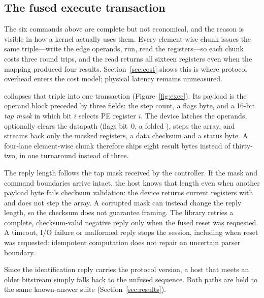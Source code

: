 \subsection{The fused execute transaction}
\label{sec:exec}

The six commands above are complete but not economical, and the reason is
visible in how a kernel actually uses them. Every element-wise chunk issues the
same triple---write the edge operands, run, read the registers---so each chunk
costs three round trips, and the read returns all sixteen registers even when
the mapping produced four results. Section~\ref{sec:cost} shows this is where
protocol overhead enters the cost model; physical latency remains unmeasured.

 collapses that triple into one transaction
(Figure~\ref{fig:exec}). Its payload is the  operand block preceded by
three fields: the step count, a flags byte, and a 16-bit \emph{tap mask} in
which bit $i$ selects PE register $i$. The device latches the operands,
optionally clears the datapath (flags bit~0, a folded ), steps the
array, and streams back only the masked registers, a data checksum and a status
byte. A four-lane element-wise chunk therefore ships eight result bytes instead
of thirty-two, in one turnaround instead of three.



The reply length follows the tap mask received by the controller. If the mask
and command boundaries arrive intact, the host knows that length even when
another payload byte fails checksum validation: the device returns current
registers with  and does not step the array. A corrupted mask can
instead change the reply length, so the checksum does not guarantee framing.
The library retries a complete, checksum-valid negative reply only when the
fused reset was requested. A timeout, I/O failure or malformed reply stops the
session, including when reset was requested: idempotent computation does not
repair an uncertain parser boundary.

Since the identification reply carries the protocol version, a host that meets
an older bitstream simply falls back to the unfused sequence. Both paths are
held to the same known-answer suite (Section~\ref{sec:results}).

